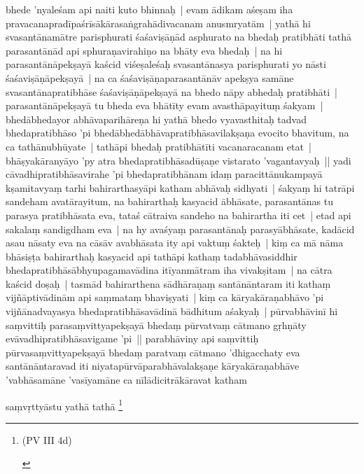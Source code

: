 \documentclass[article,12pt,a4paper]{memoir}
\begin{document}
	  \pstart bhede 'nyaleśam api naiti kuto bhinnaḥ | evam ādikam aśeṣam iha pravacanapradīpaśrīsākārasaṅgrahādivacanam anusmryatām | \label{thakur75-147.21} yathā hi svasantānamātre parisphurati śaśaviṣāṇād asphurato na bhedaḥ pratibhāti tathā parasantānād api sphuraṇavirahiṇo na bhāty eva bhedaḥ | na hi parasantānāpekṣayā kaścid viśeṣaleśaḥ svasantānasya parisphurati yo nāsti śaśaviṣāṇāpekṣayā | na ca śaśaviṣāṇaparasantānāv apekṣya samāne svasantānapratibhāse śaśaviṣāṇāpekṣayā na bhedo nāpy abhedaḥ pratibhāti | parasantānāpekṣayā tu bheda eva bhātīty evam avasthāpayituṃ śakyam | \label{thakur75-147.27} bhedābhedayor abhāvaparihāreṇa hi yathā bhedo vyavasthitaḥ tadvad bhedapratibhāso 'pi bhedābhedābhāvapratibhāsavilakṣaṇa evocito bhavitum, na ca tathānubhūyate | tathāpi bhedaḥ pratibhātīti vacanaracanam etat | bhāṣyakāranyāyo 'py atra bhedapratibhāsadūṣaṇe vistarato 'vagantavyaḥ || \label{thakur75-148.1} yadi cāvadhipratibhāsavirahe 'pi bhedapratibhānam idaṃ paracittānukampayā kṣamitavyaṃ tarhi bahirarthasyāpi katham abhāvaḥ sidhyati | śakyaṃ hi tatrāpi sandeham avatārayitum, na bahirarthaḥ kasyacid ābhāsate, parasantānas tu parasya pratibhāsata eva, tataś cātraiva sandeho na bahirartha iti cet | etad api sakalaṃ sandigdham eva | na hy avaśyaṃ parasantānaḥ parasyābhāsate, kadācid asau nāsaty eva na cāsāv avabhāsata ity api vaktuṃ śakteḥ | \label{thakur75-148.7} kiṃ ca mā nāma bhāsiṣṭa bahirarthaḥ kasyacid api tathāpi kathaṃ tadabhāvasiddhir bhedapratibhāsābhyupagamavādina itīyanmātram iha vivakṣitam | na cātra kaścid doṣaḥ | tasmād bahirarthena sādhāraṇaṃ santānāntaram iti kathaṃ vijñāptivādinām api saṃmataṃ bhaviṣyati | kiṃ ca kāryakāraṇabhāvo 'pi vijñānadvayasya bhedapratibhāsavādinā bādhitum aśakyaḥ | pūrvabhāvinī hi saṃvittiḥ parasaṃvittyapekṣayā bhedaṃ pūrvatvaṃ cātmano gṛhṇāty evāvadhipratibhāsavigame 'pi || \label{thakur75-148.13} parabhāviny api saṃvittiḥ pūrvasaṃvittyapekṣayā bhedaṃ paratvaṃ cātmano 'dhigacchaty eva santānāntaravad iti niyatapūrvāparabhāvalakṣaṇe kāryakāraṇabhāve 'vabhāsamāne 'vasīyamāne ca nīlādicitrākāravat katham
	\pend
      

	  \pstart saṃvṛttyāstu yathā tathā \footnote{\begin{english}(PV III 4d)\end{english}}
	\pend
      
\end{document}
